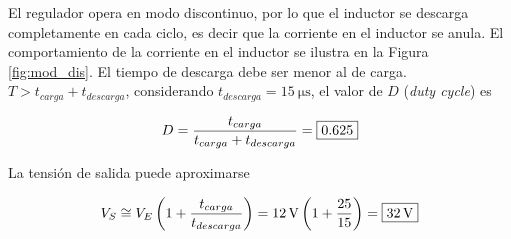 \begin{itemize}

		El regulador opera en modo discontinuo, por lo que el inductor se descarga completamente en cada ciclo, es decir que la corriente en el inductor se anula. El comportamiento de la corriente en el inductor se ilustra en la Figura \ref{fig:mod_dis}. El tiempo de descarga debe ser menor al de carga. $T > t_{carga} + t_{descarga}$, considerando $t_{descarga} = \SI{15}{\micro\second}$, el valor de $D$ (\textit{duty cycle}) es 

		\begin{equation}
			\centering
			D = \frac{t_{carga}}{t_{carga} + t_{descarga}} =\boxed{\num{0,625}}
		\end{equation}
		
		La tensión de salida puede aproximarse

		\begin{equation}
			\centering
			V_S \cong V_E \left( 1 + \frac{t_{carga}}{t_{descarga}} \right) = \SI{12}{\volt} \left(1+ \frac{25}{15}\right) = \boxed{\SI{32}{\volt}}
		\end{equation}
\end{itemize}





